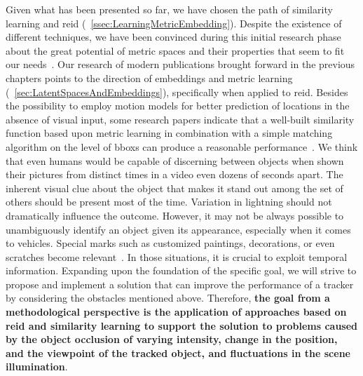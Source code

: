 Given what has been presented so far, we have chosen the path of similarity learning and \gls{reid} (\sectionstr{}~\ref{ssec:LearningMetricEmbedding}). Despite the existence of different techniques, we have been convinced during this initial research phase about the great potential of metric spaces and their properties that seem to fit our needs~\cite{liu2016ssd}. Our research of modern publications brought forward in the previous chapters points to the direction of embeddings and metric learning (\sectionstr{}~\ref{sec:LatentSpacesAndEmbeddings}), specifically when applied to \gls{reid}. Besides the possibility to employ motion models for better prediction of locations in the absence of visual input, some research papers indicate that a well-built similarity function based upon metric learning in combination with a simple matching algorithm on the level of \glspl{bbox} can produce a reasonable performance~\cite{tao2016sint}. We think that even humans would be capable of discerning between objects when shown their pictures from distinct times in a video even dozens of seconds apart. The inherent visual clue about the object that makes it stand out among the set of others should be present most of the time. Variation in lightning should not dramatically influence the outcome. However, it may not be always possible to unambiguously identify an object given its appearance, especially when it comes to vehicles. Special marks such as customized paintings, decorations, or even scratches become relevant~\cite{liu2016ssd}. In those situations, it is crucial to exploit temporal information. Expanding upon the foundation of the specific goal, we will strive to propose and implement a solution that can improve the performance of a tracker by considering the obstacles mentioned above. Therefore, \textbf{the goal from a methodological perspective is the application of approaches based on \gls{reid} and similarity learning to support the solution to problems caused by the object occlusion of varying intensity, change in the position, and the viewpoint of the tracked object, and fluctuations in the scene illumination}.

